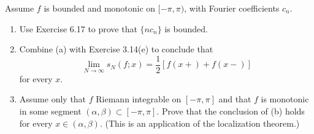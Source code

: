 \documentclass[a4paper, 12pt]{article}
\begin{document}
\begin{problem} [8.17]
    Assume $f$ is bounded and monotonic on $[-\pi, \pi)$, with Fourier coefficients $c_n$.
    \begin{enumerate}
    \item Use Exercise 6.17 to prove that $\{nc_n\}$ is bounded.
    \item Combine (a) with Exercise 3.14(e) to conclude that \begin{equation*}
    \lim_{N \to \infty} s_N(f; x) = \frac{1}{2} [f(x+) + f(x-)]
    \end{equation*}
    for every $x$.
    \item Assume only that $f$ Riemann integrable on $[-\pi, \pi]$ and that $f$ is monotonic in some segment $(\alpha, \beta) \subset [-\pi, \pi]$. Prove that the conclusion of (b) holds for every $x \in (\alpha, \beta)$. (This is an application of the localization theorem.)
    \end{enumerate}
\end{problem}
\end{document}

